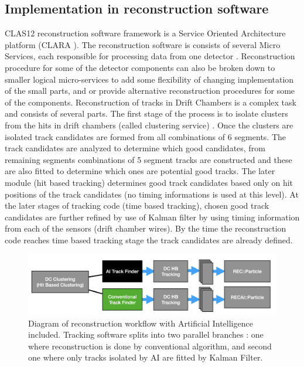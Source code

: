 \subsection{Implementation in reconstruction software}

CLAS12 reconstruction software framework is a Service Oriented Architecture platform (CLARA \cite{Gyurjyan:2011zz}).
The reconstruction software is consists of several Micro Services, each responsible for processing data from one
detector \cite{Ziegler:2020gsr}. Reconstruction procedure for some of the detector components can also 
be broken down to smaller logical micro-services to add some flexibility of changing implementation of the small parts, 
and or provide alternative reconstruction procedures for some of the components.
Reconstruction of tracks in Drift Chambers is a complex task and consists of several parts.
The first stage of the process is to isolate clusters
from the hits in drift chambers (called clustering service) . Once the clusters are isolated track candidates are formed from all combinations 
of 6 segments. The track candidates are analyzed to determine which good candidates, from remaining segments 
combinations of 5 segment tracks are constructed and these are also fitted to determine which ones are potential good tracks.
The later module (hit based tracking) determines good track candidates based only on hit positions of the track candidates (no timing
informations is used at this level). At the later stages of tracking code (time based tracking), chosen good track candidates are further refined by use of Kalman filter by using timing information from each of the sensors (drift chamber wires). By the time the reconstruction code reaches time based
tracking stage the track candidates are already defined. 

\begin{figure}[!ht]
\begin{center}
 \includegraphics[width=6.0in]{images/recon_diagram.png}
\caption {Diagram of reconstruction workflow with Artificial Intelligence included. Tracking software splits into two parallel branches : one where reconstruction is done by conventional algorithm, and second one where only tracks isolated by AI are fitted by Kalman Filter.}
 \label{recon:diagram}
 \end{center}
\end{figure}

